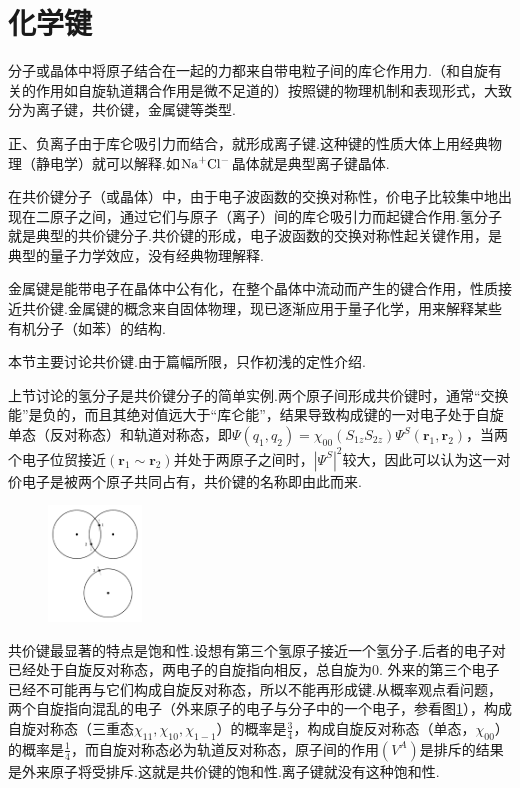 \section[化学键]{化学键} \label{sec:10.05} %

分子或晶体中将原子结合在一起的力都来自带电粒子间的库仑作用力.（和自旋有关的作用如自旋轨道耦合作用是微不足道的）按照键的物理机制和表现形式，大致分为离子键，共价键，金属键等类型.

正、负离子由于库仑吸引力而结合，就形成离子键.这种键的性质大体上用经典物理（静电学）就可以解释.如$\ce{Na^{+}}\ce{Cl^{-}}$晶体就是典型离子键晶体.

在共价键分子（或晶体）中，由于电子波函数的交换对称性，价电子比较集中地出现在二原子之间，通过它们与原子（离子）间的库仑吸引力而起键合作用.氢分子就是典型的共价键分子.共价键的形成，电子波函数的交换对称性起关键作用，是典型的量子力学效应，没有经典物理解释.

金属键是能带电子在晶体中公有化，在整个晶体中流动而产生的键合作用，性质接近共价键.金属键的概念来自固体物理，现已逐渐应用于量子化学，用来解释某些有机分子（如苯）的结构.

本节主要讨论共价键.由于篇幅所限，只作初浅的定性介绍.

上节讨论的氢分子是共价键分子的简单实例.两个原子间形成共价键时，通常“交换能”是负的，而且其绝对值远大于“库仑能”，结果导致构成键的一对电子处于自旋单态（反对称态）和轨道对称态，即$\Psi(q_{1},q_{2})=\chi_{00}(S_{1z}S_{2z})\varPsi^{S}(\boldsymbol{r}_{1},\boldsymbol{r}_{2})$，当两个电子位贸接近$(\boldsymbol{r}_{1}\sim\boldsymbol{r}_{2})$并处于两原子之间时，$|{\varPsi^{S}}|^{2}$较大，因此可以认为这一对价电子是被两个原子共同占有，共价键的名称即由此而来.

\begin{figure}
	\centering
	\small
	\includegraphics[width=2.5cm,clip]{QM file/figure/10-7}
	\caption{}\label{fig.10-7}
\end{figure}

共价键最显著的特点是饱和性.设想有第三个氢原子接近一个氢分子.后者的电子对已经处于自旋反对称态，两电子的自旋指向相反，总自旋为0.
外来的第三个电子已经不可能再与它们构成自旋反对称态，所以不能再形成键.从概率观点看问题，两个自旋指向混乱的电子（外来原子的电子与分子中的一个电子，参看图\ref{fig.10-7}），构成自旋对称态（三重态$\chi_{11},\chi_{10},\chi_{1-1}$）的概率是$\frac{3}{4}$，构成自旋反对称态（单态，$\chi_{00}$）的概率是$\frac{1}{4}$，而自旋对称态必为轨道反对称态，原子间的作用$(V^{A})$是排斥的结果是外来原子将受排斥.这就是共价键的饱和性.离子键就没有这种饱和性.

